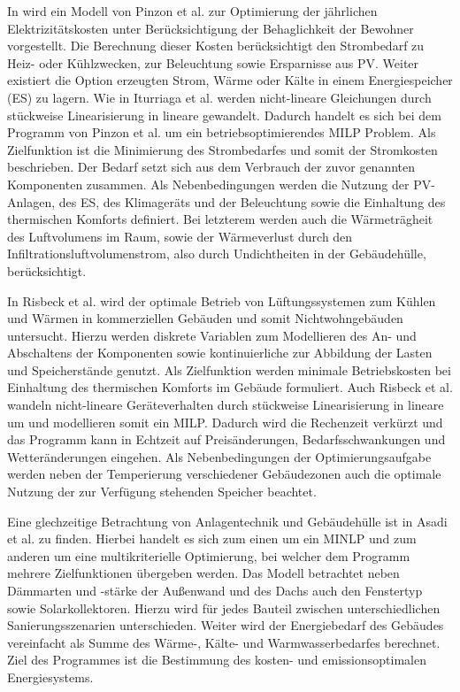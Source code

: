 In \cite{Pinzon.23.04.201726.04.2017} wird ein Modell von Pinzon et al. zur Optimierung der jährlichen Elektrizitätskosten unter Berücksichtigung der Behaglichkeit der Bewohner vorgestellt.
Die Berechnung dieser Kosten berücksichtigt den Strombedarf zu Heiz- oder Kühlzwecken, zur Beleuchtung sowie Ersparnisse aus PV.
Weiter existiert die Option erzeugten Strom, Wärme oder Kälte in einem Energiespeicher (ES) zu lagern.
Wie in Iturriaga et al. \cite{Iturriaga.2017} werden nicht-lineare Gleichungen durch stückweise Linearisierung in lineare gewandelt.
Dadurch handelt es sich bei dem Programm von Pinzon et al. um ein betriebsoptimierendes MILP Problem.
Als Zielfunktion ist die Minimierung des Strombedarfes und somit der Stromkosten beschrieben.
Der Bedarf setzt sich aus dem Verbrauch der zuvor genannten Komponenten zusammen.
Als Nebenbedingungen werden die Nutzung der PV-Anlagen, des ES, des Klimageräts und der Beleuchtung sowie die Einhaltung des thermischen Komforts definiert.
Bei letzterem werden auch die Wärmeträgheit des Luftvolumens im Raum, sowie der Wärmeverlust durch den Infiltrationsluftvolumenstrom, also durch Undichtheiten in der Gebäudehülle, berücksichtigt.

In Risbeck et al. \cite{Risbeck.2017} wird der optimale Betrieb von Lüftungssystemen zum Kühlen und Wärmen in kommerziellen Gebäuden und somit Nichtwohngebäuden untersucht.
Hierzu werden diskrete Variablen zum Modellieren des An- und Abschaltens der Komponenten sowie kontinuierliche zur Abbildung der Lasten und Speicherstände genutzt.
Als Zielfunktion werden minimale Betriebskosten bei Einhaltung des thermischen Komforts im Gebäude formuliert.
Auch Risbeck et al. wandeln nicht-lineare Geräteverhalten durch stückweise Linearisierung in lineare um und modellieren somit ein MILP.
Dadurch wird die Rechenzeit verkürzt und das Programm kann in Echtzeit auf Preisänderungen, Bedarfsschwankungen und Wetteränderungen eingehen.
Als Nebenbedingungen der Optimierungsaufgabe werden neben der Temperierung verschiedener Gebäudezonen auch die optimale Nutzung der zur Verfügung stehenden Speicher beachtet.

Eine glechzeitige Betrachtung von Anlagentechnik und Gebäudehülle ist in Asadi et al. \cite{Asadi.2012} zu finden.
Hierbei handelt es sich zum einen um ein MINLP und zum anderen um eine multikriterielle Optimierung, bei welcher dem Programm mehrere Zielfunktionen übergeben werden.
Das Modell betrachtet neben Dämmarten und -stärke der Außenwand und des Dachs auch den Fenstertyp sowie Solarkollektoren. 
Hierzu wird für jedes Bauteil zwischen unterschiedlichen Sanierungsszenarien unterschieden.
Weiter wird der Energiebedarf des Gebäudes vereinfacht als Summe des Wärme-, Kälte- und Warmwasserbedarfes berechnet.
Ziel des Programmes ist die Bestimmung des kosten- und emissionsoptimalen Energiesystems.

